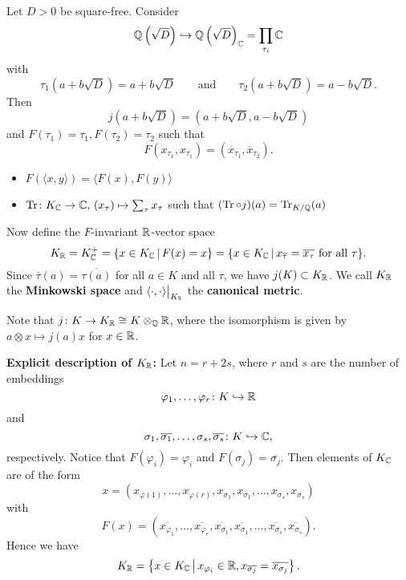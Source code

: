 \begin{Bsp*}
Let $D > 0$ be square-free. Consider
\[ \mathbb{Q}\left( \sqrt{D} \right) \hookrightarrow \mathbb{Q}\left( \sqrt{D} \right)_{\mathbb{C}}
= \prod_{\tau_i} \mathbb{C}
\]
with
\[ \tau_1\left( a+b\sqrt{D} \right) = a+b\sqrt{D} 
\qquad \text{and} \qquad
\tau_2\left( a+b\sqrt{D} \right) = a-b\sqrt{D}.
\]
Then
\[ j \left( a+b\sqrt{D} \right) = \left( a+b\sqrt{D} ,  a-b\sqrt{D}\right)
\]
and $F(\tau_1) = \tau_1, F(\tau_2) = \tau_2$ such that
\[ F\left( x_{\tau_1}, x_{\tau_1}  \right) 
= \left( \overline{x}_{\tau_1}, \overline{x}_{\tau_2}  \right).
\]
\end{Bsp*}

\bigskip
\begin{Bem*}\begin{itemize}
\item $F(\langle x, y \rangle ) = \langle F(x), F(y) \rangle$
\item $\operatorname{Tr} \colon K_{\mathbb{C}} \to \mathbb{C}, \, \left( x_\tau\right) \mapsto \sum_\tau x_\tau$
such that $(\operatorname{Tr} \circ j) (a) = \operatorname{Tr}_{K/\mathbb{Q}}(a)$
\end{itemize}
\end{Bem*}


\bigskip
Now define the $F$-invariant $\mathbb{R}$-vector space
\[ K_{\mathbb{R}} = K_{\mathbb{C}}^+ 
=\{ x \in K_{\mathbb{C}}\, | \, F(x) = x \}
=\{ x \in K_{\mathbb{C}}\, | \, x_{\overline{\tau}} = \overline{x_\tau} \text{ for all } \tau \}.
\]
Since $\overline{\tau}(a) = \overline{\tau(a)}$ for all $a \in K$ and all $\tau$, we have $j(K) \subset K_{\mathbb{R}}$. We call $K_{\mathbb{R}}$ the \textbf{Minkowski space} and
$\langle \cdot, \cdot \rangle \big|_{K_{\mathbb{R}}}$ the \textbf{canonical metric}.


\bigskip
\begin{Bem*}
Note that $j \colon K \to K_{\mathbb{R}} \cong K \otimes_{\mathbb{Q}} \mathbb{R}$, where the isomorphism is given by $a \otimes x \mapsto j(a) x$ for $x \in \mathbb{R}$.
\end{Bem*}


\bigskip
\textbf{Explicit description of $K_{\mathbb{R}}$:} Let $n = r+2s$, where $r$ and $s$ are the number of embeddings
\[ \varphi_1, \dots, \varphi_r \colon K \hookrightarrow \mathbb{R}
\]
and
\[ \sigma_1, \overline{\sigma_1}, \dots, \sigma_s, \overline{\sigma_s} \colon K \hookrightarrow \mathbb{C},
\]
respectively. Notice that $F(\varphi_i) = \varphi_i$ and $F(\sigma_j) = \overline{\sigma_j}$.
Then elements of $K_{\mathbb{C}}$ are of the form
\[ x = \left( x_{\varphi(1)}, \dots, x_{\varphi(r)},  x_{\sigma_1}, x_{\overline{\sigma_1}}, \dots, x_{\sigma_s}, x_{\overline{\sigma_s}} \right)
\]
with
\[ F(x) = \left( \overline{x_{\varphi_1}}, \dots, \overline{x_{\varphi_r}},  \overline{x_{\overline{\sigma_1}}}, \overline{x_{\sigma_1}}, \dots, \overline{x_{\overline{\sigma_s}}}, \overline{x_{\sigma_s}} \right).
\]
Hence we have
\[ K_{\mathbb{R}} = \left\{
x \in K_{\mathbb{C}} \, \big| \, x_{\varphi_i} \in \mathbb{R}, x_{\overline{\sigma_j}} = \overline{x_{\sigma_{j}}}
\right\}.
\]


